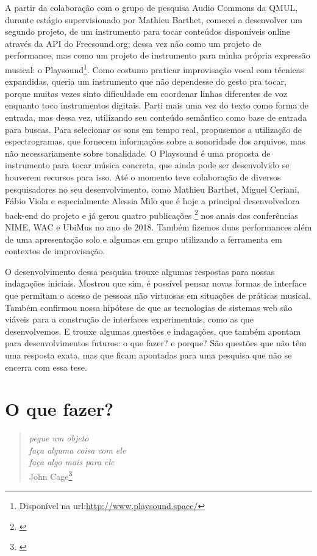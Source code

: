 A partir da colaboração com o grupo de pesquisa Audio Commons da QMUL, durante estágio supervisionado por Mathieu Barthet, comecei a desenvolver um segundo projeto, de um instrumento para tocar conteúdos disponíveis online através da API do Freesound.org; dessa vez não como um projeto de performance, mas como um projeto de instrumento para minha própria expressão musical: o Playsound\footnote{Disponível na url:\url{http://www.playsound.space/}}. Como costumo praticar improvisação vocal com técnicas expandidas, queria um instrumento que não dependesse do gesto pra tocar, porque muitas vezes sinto dificuldade em coordenar linhas diferentes de voz enquanto toco instrumentos digitais. Parti mais uma vez do texto como forma de entrada, mas dessa vez, utilizando seu conteúdo semântico como base de entrada para buscas. Para selecionar os sons em tempo real, propusemos a utilização de espectrogramas, que fornecem informações sobre a sonoridade dos arquivos, mas não necessariamente sobre tonalidade. O Playsound é uma proposta de instrumento para tocar música concreta, que ainda pode ser desenvolvido se houverem recursos para isso. Até o momento teve colaboração de diversos pesquisadores no seu desenvolvimento, como Mathieu Barthet, Miguel Ceriani, Fábio Viola e especialmente Alessia Milo que é hoje a principal desenvolvedora back-end do projeto e já gerou quatro publicações \footnote{\cite{Stolfi2018b, Viola2018, Stolfi2018b, Stolfi2018w}} nos anais das conferências NIME, WAC e UbiMus no ano de 2018. Também fizemos duas performances além de uma apresentação solo e algumas em grupo utilizando a ferramenta em contextos de improvisação.

O desenvolvimento dessa pesquisa trouxe algumas respostas para nossas indagações iniciais. Mostrou que sim, é possível pensar novas formas de interface que permitam o acesso de pessoas não virtuosas em situações de práticas musical. Também confirmou nossa hipótese de que as tecnologias de sistemas web são viáveis para a construção de interfaces experimentais, como as que desenvolvemos. E trouxe algumas questões e indagações, que também apontam para desenvolvimentos futuros: o que fazer? e porque? São questões que não têm uma resposta exata, mas que ficam apontadas para uma pesquisa que não se encerra com essa tese.


\section{O que fazer?}

\begin{quote} {\small
\textit{
pegue um objeto\\
faça alguma coisa com ele\\
faça algo mais para ele\\ }
John Cage\footnote{\cite[p.71]{Cage2015}}}
\end{quote}


